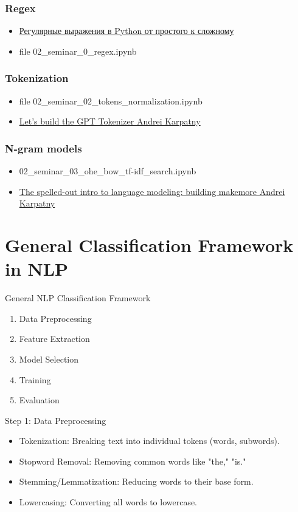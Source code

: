 \documentclass{beamer}
\begin{document}
\begin{frame}
\frametitle{Regex}
\begin{itemize}
    \item \href{https://habr.com/ru/articles/349860/}{Регулярные выражения в Python от простого к сложному}
    \item file 02\_seminar\_0\_regex.ipynb
\end{itemize}
\end{frame}

\begin{frame}
\frametitle{Tokenization}
\begin{itemize}
    \item file 02\_seminar\_02\_tokens\_normalization.ipynb
    \item \href{https://www.youtube.com/watch?v=zduSFxRajkE}{Let's build the GPT Tokenizer Andrei Karpatny}
\end{itemize}
\end{frame}

\begin{frame}
\frametitle{N-gram models}
\begin{itemize}
    \item 02\_seminar\_03\_ohe\_bow\_tf-idf\_search.ipynb
    \item \href{https://www.youtube.com/watch?v=PaCmpygFfXo}{The spelled-out intro to language modeling: building makemore Andrei Karpatny}
\end{itemize}
\end{frame}

\section{General Classification Framework in NLP}
\begin{frame}{General NLP Classification Framework}
    \begin{enumerate}
        \item Data Preprocessing
        \item Feature Extraction
        \item Model Selection
        \item Training
        \item Evaluation
    \end{enumerate}
\end{frame}

\begin{frame}{Step 1: Data Preprocessing}
    \begin{itemize}
        \item Tokenization: Breaking text into individual tokens (words, subwords).
        \item Stopword Removal: Removing common words like "the," "is."
        \item Stemming/Lemmatization: Reducing words to their base form.
        \item Lowercasing: Converting all words to lowercase.
    \end{itemize}
\end{frame}
\end{document}
